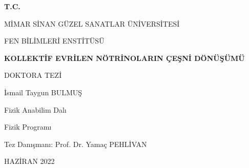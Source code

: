 \documentclass[a4paper,12pt,oneside]{book}
\begin{document}
\newcommand\barparen[1]{\overset{%
   \scalebox{0.4}{$(\mkern-1mu-\mkern-1mu)$}}{#1}}
\newcommand\barparenBig[1]{\overset{(-)}{#1}}

\renewcommand*\contentsname{İÇİNDEKİLER}
\renewcommand*\listfigurename{ŞEKİL LİSTESİ}
\renewcommand*\listtablename{TABLO LİSTESİ}
\renewcommand*\abstractname{ÖZET}
\renewcommand*\bibname{KAYNAKLAR}
\renewcommand*\appendix{EKLER}

\begin{titlepage}
	\centering
	\setlength{\topmargin}{0cm}
	\begin{Large}\bfseries
	T.C.\par
	MİMAR SİNAN GÜZEL SANATLAR ÜNİVERSİTESİ\par
	FEN BİLİMLERİ ENSTİTÜSÜ\par
	\end{Large}
	\vspace{4.5cm}
	\begin{large}\bfseries
		KOLLEKTİF EVRİLEN NÖTRİNOLARIN ÇEŞNİ DÖNÜŞÜMÜ\par
	\vspace{2cm}
	DOKTORA TEZİ\par
	\vspace{0.5cm}
	İsmail Taygun BULMUŞ\par
	\vspace{3cm}
	Fizik Anabilim Dalı\par
	\vspace{0.5cm}
	Fizik Programı\par
	\vspace{2cm}
	Tez Danışmanı: Prof. Dr. Yamaç PEHLİVAN\par
	\vspace{3cm}
	HAZİRAN 2022\par
	\end{large}
	\vfill
\end{titlepage}

\thispagestyle{empty}
\mbox{}
\newpage
\end{document}
